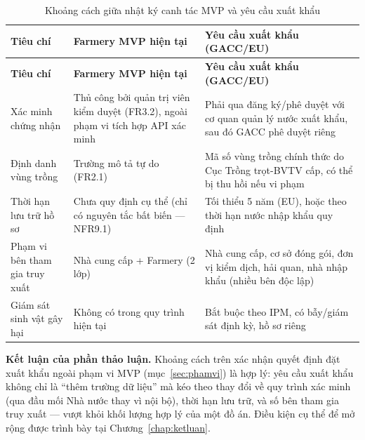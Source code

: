 \begingroup
\small
\renewcommand{\arraystretch}{1.3}
\begin{longtable}{L{3.0cm} L{5.5cm} L{5.5cm}}
\caption{Khoảng cách giữa nhật ký canh tác MVP và yêu cầu xuất khẩu}
\label{tab:khoangcachxuatkhau} \\
\toprule
{}
\textbf{Tiêu chí} & \textbf{Farmery MVP hiện tại} & \textbf{Yêu cầu xuất khẩu (GACC/EU)} \\
\midrule
\endfirsthead
\toprule
{}
\textbf{Tiêu chí} & \textbf{Farmery MVP hiện tại} & \textbf{Yêu cầu xuất khẩu (GACC/EU)} \\
\midrule
\endhead
\bottomrule
\endfoot
Xác minh chứng nhận & Thủ công bởi quản trị viên kiểm duyệt (FR3.2), ngoài phạm vi tích hợp API xác minh & Phải qua đăng ký/phê duyệt với cơ quan quản lý nước xuất khẩu, sau đó GACC phê duyệt riêng \\
Định danh vùng trồng & Trường mô tả tự do (FR2.1) & Mã số vùng trồng chính thức do Cục Trồng trọt-BVTV cấp, có thể bị thu hồi nếu vi phạm \\
Thời hạn lưu trữ hồ sơ & Chưa quy định cụ thể (chỉ có nguyên tắc bất biến --- NFR9.1) & Tối thiểu 5 năm (EU), hoặc theo thời hạn nước nhập khẩu quy định \\
Phạm vi bên tham gia truy xuất & Nhà cung cấp + Farmery (2 lớp) & Nhà cung cấp, cơ sở đóng gói, đơn vị kiểm dịch, hải quan, nhà nhập khẩu (nhiều bên độc lập) \\
Giám sát sinh vật gây hại & Không có trong quy trình hiện tại & Bắt buộc theo IPM, có bẫy/giám sát định kỳ, hồ sơ riêng \\
\end{longtable}
\endgroup

\noindent\textbf{Kết luận của phần thảo luận.} Khoảng cách trên xác nhận quyết định đặt xuất khẩu ngoài phạm vi MVP (mục~\ref{sec:phamvi}) là hợp lý: yêu cầu xuất khẩu không chỉ là ``thêm trường dữ liệu'' mà kéo theo thay đổi về quy trình xác minh (qua đầu mối Nhà nước thay vì nội bộ), thời hạn lưu trữ, và số bên tham gia truy xuất --- vượt khỏi khối lượng hợp lý của một đồ án. Điều kiện cụ thể để mở rộng được trình bày tại Chương~\ref{chap:ketluan}.



